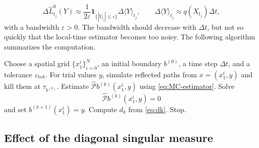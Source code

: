 \documentclass[pdflatex,sn-mathphys-num]{sn-jnl}
\theoremstyle{plain}
\theoremstyle{definition}
\theoremstyle{remark}
\numberwithin{equation}{section}
\begin{document}
\begin{equation} \label{eq:local-time-approx} 
\Delta \widehat L_{t_j}^0(Y) \approx \frac{1}{2\varepsilon} \mathbf 1_{\{|Y_{t_j}|\le\varepsilon\}} \Delta \langle Y\rangle_{t_j}, \qquad \Delta\langle Y\rangle_{t_j} \approx q(X_{t_j})\Delta t , 
\end{equation} 
with a bandwidth \(\varepsilon>0\). The bandwidth should decrease with \(\Delta t\), but not so quickly that the local-time estimator becomes too noisy. The following algorithm summarizes the computation. 
\begin{algorithm}[htbp] \caption{Killed-resolvent boundary iteration} \label{alg:killed-picard} 
\begin{algorithmic}[1] 
\State Choose a spatial grid \(\{x_1^i\}_{i=0}^N\), an initial boundary \(b^{(0)}\), a time step \(\Delta t\), and a tolerance \(\varepsilon_{\rm tol}\). 
\State For trial values \(y\), simulate reflected paths from \(x=(x_1^i,y)\) and kill them at \(\tau_{b^{(k)}}\). 
\State Estimate \(\widehat{\mathcal P}{b^{(k)}}(x_1^i,y)\) using \eqref{eq:MC-estimator}. 
\State Solve \[ \widehat{\mathcal P}{b^{(k)}}(x_1^i,y)=0 \] and set \(b^{(k+1)}(x_1^i)=y\). 
\EndFor 
\State Compute \(d_k\) from \eqref{eq:dk}. 
\State Stop. 
\EndIf 
\EndFor 
\end{algorithmic} 
\end{algorithm} 

\subsection{Effect of the diagonal singular measure} \label{subsec:diagonal-effect} 
\end{document}
